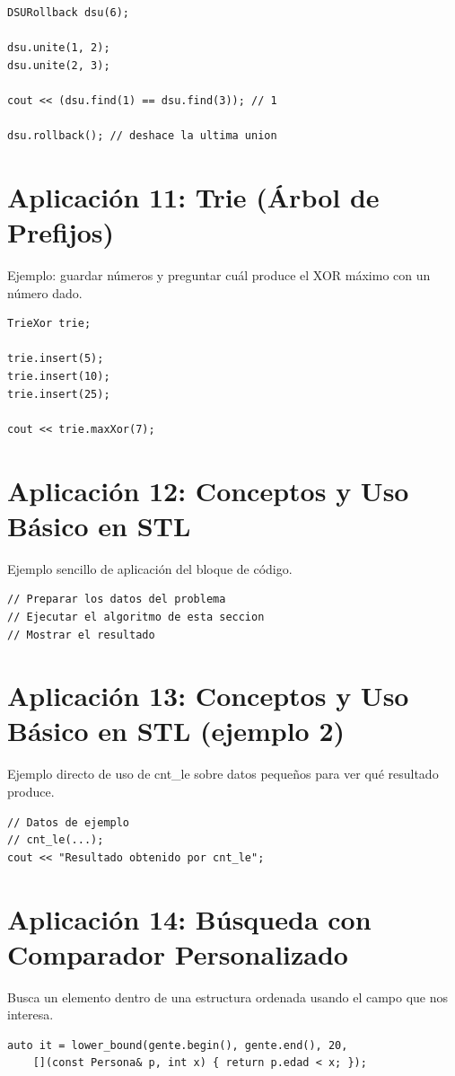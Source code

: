 \documentclass[10pt,twocolumn,letterpaper]{report}
\begin{document}
\begin{lstlisting}
DSURollback dsu(6);

dsu.unite(1, 2);
dsu.unite(2, 3);

cout << (dsu.find(1) == dsu.find(3)); // 1

dsu.rollback(); // deshace la ultima union
\end{lstlisting}

\section{Aplicación 11: Trie (Árbol de Prefijos)}
Ejemplo: guardar números y preguntar cuál produce el XOR máximo con un número dado.

\begin{lstlisting}
TrieXor trie;

trie.insert(5);
trie.insert(10);
trie.insert(25);

cout << trie.maxXor(7);
\end{lstlisting}

\section{Aplicación 12: Conceptos y Uso Básico en STL}
Ejemplo sencillo de aplicación del bloque de código.

\begin{lstlisting}
// Preparar los datos del problema
// Ejecutar el algoritmo de esta seccion
// Mostrar el resultado
\end{lstlisting}

\section{Aplicación 13: Conceptos y Uso Básico en STL (ejemplo 2)}
Ejemplo directo de uso de cnt\_le sobre datos pequeños para ver qué resultado produce.

\begin{lstlisting}
// Datos de ejemplo
// cnt_le(...);
cout << "Resultado obtenido por cnt_le";
\end{lstlisting}

\section{Aplicación 14: Búsqueda con Comparador Personalizado}
Busca un elemento dentro de una estructura ordenada usando el campo que nos interesa.

\begin{lstlisting}
auto it = lower_bound(gente.begin(), gente.end(), 20,
    [](const Persona& p, int x) { return p.edad < x; });
\end{lstlisting}
\end{document}
